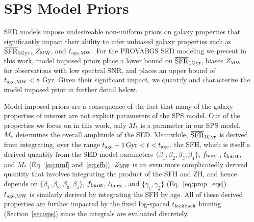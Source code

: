 \section{SPS Model Priors} \label{sec:model_priors}
SED models impose undesireable non-uniform priors on galaxy properties that
significantly impact their ability to infer unbiased galaxy properties such as
$\overline{\rm SFR}_{\rm 1Gyr}$, $Z_{\rm MW}$, and $t_{\rm age, MW}$. 
For the PROVABGS SED modeling we present in this work, model imposed priors
place a lower bound on $\overline{\rm SFR}_{\rm 1Gyr}$, biases $Z_{\rm MW}$ for observations with low
spectral SNR, and places an upper bound of $t_{\rm age, MW} < 8$ Gyr.
Given their significant impact, we quantify and characterize the model imposed
prior in further detail below. 

Model imposed priors are a consequence of the fact that many of the galaxy
properties of interest are not explicit parameters of the SPS model. 
Out of the properties we focus on in this work, only $M_*$ is a parameter in
our SPS model. 
$M_*$ determines the overall amplitude of the SED. 
Meanwhile, $\overline{\rm SFR}_{\rm 1Gyr}$ is derived from integrating, over the range 
$t_{\rm age} - 1\,{\rm Gyr} < t < t_{\rm age}$, the SFH, which is itself a
derived quantity from the SED model parameters $\{\beta_1, \beta_2, \beta_3,
\beta_4 \}$, $f_{\rm burst}$, $t_{\rm burst}$, and $M_*$ (Eq.~\ref{eq:nmf}
and~\ref{eq:sfh}).
$Z_{\rm MW}$ is an even more complicatedly derived quantity that involves integrating
the product of the SFH and ZH, and hence depends on $\{\beta_1, \beta_2,
\beta_3, \beta_4 \}$, $f_{\rm burst}$, $t_{\rm burst}$, and $\{\gamma_1,
\gamma_2\}$ (Eq.~\ref{eq:prop_eqs}).
$t_{\rm age, MW}$ is similarly derived by integrating the SFH by age. 
All of these derived properties are further impacted by the fixed log-spaced
$t_{\rm lookback}$ binning (Section~\ref{sec:sps}) since the integrals are evaluated
discretely. 


